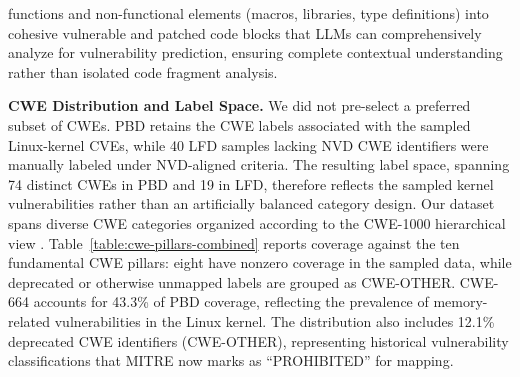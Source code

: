 \documentclass[lettersize,journal]{IEEEtran}
\begin{document}
functions and non-functional elements (macros, libraries, type definitions) into cohesive vulnerable and patched code blocks that LLMs can comprehensively analyze for vulnerability prediction, ensuring complete contextual understanding rather than isolated code fragment analysis.

\textbf{\gls{CWE} Distribution and Label Space.} We did not pre-select a preferred subset of CWEs. PBD retains the CWE labels associated with the sampled Linux-kernel CVEs, while 40 LFD samples lacking NVD CWE identifiers were manually labeled under NVD-aligned criteria. The resulting label space, spanning 74 distinct CWEs in PBD and 19 in LFD, therefore reflects the sampled kernel vulnerabilities rather than an artificially balanced category design. Our dataset spans diverse \gls{CWE} categories organized according to the CWE-1000 hierarchical view \cite{cwe1000}. Table~\ref{table:cwe-pillars-combined} reports coverage against the ten fundamental \gls{CWE} pillars: eight have nonzero coverage in the sampled data, while deprecated or otherwise unmapped labels are grouped as CWE-OTHER. CWE-664 accounts for 43.3\% of PBD coverage, reflecting the prevalence of memory-related vulnerabilities in the Linux kernel. The distribution also includes 12.1\% deprecated \gls{CWE} identifiers (CWE-OTHER), representing historical vulnerability classifications that MITRE now marks as \enquote{PROHIBITED} for mapping.

\begin{table}[!t]
\centering
\caption{LLMKernelBench dataset statistics}
\label{table:dataset-stats}
\scriptsize
\setlength{\tabcolsep}{22pt}
\renewcommand{\arraystretch}{1.1}
\end{table}
\end{document}
